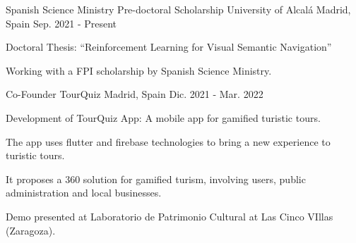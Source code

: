 
\begin{cventries}

    \cventry
    {Spanish Science Ministry Pre-doctoral Scholarship} %
    {University of Alcalá} %
    {Madrid, Spain} %
    {Sep. 2021 - Present} %
    {
        \begin{cvitems} %
            \item {Doctoral Thesis: ``Reinforcement Learning for Visual Semantic Navigation”}
            \item {Working with a FPI scholarship by Spanish Science Ministry.}
        \end{cvitems}
    }

    \cventry
    {Co-Founder} %
    {TourQuiz} %
    {Madrid, Spain} %
    {Dic. 2021 - Mar. 2022} %
    {
        \begin{cvitems} %
            \item {Development of TourQuiz App: A mobile app for gamified turistic tours.}
            \item {The app uses flutter and firebase technologies to bring a new experience to turistic tours.}
            \item {It proposes a 360 solution for gamified turism, involving users, public administration and local businesses.}
            \item {Demo presented at Laboratorio de Patrimonio Cultural at Las Cinco VIllas (Zaragoza).}
        \end{cvitems}
    }


\end{cventries}
